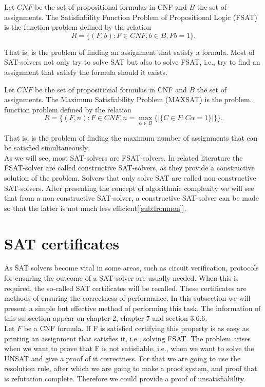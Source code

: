 \begin{definition}
  Let $CNF$ be the set of propositional formulas in CNF and $B$ the set of assignments.  The Satisfiability Function Problem of Propositional Logic (FSAT) is the function problem defined by the relation $$R=\{(F, b): F\in CNF, b \in B, Fb = 1\}.$$
\end{definition}
That is, is the problem of finding an assignment that satisfy a formula. Most of SAT-solvers not only try to solve SAT but also to solve FSAT, i.e., try to find an assignment that satisfy  the formula should it exists.
\begin{definition}
  Let $CNF$ be the set of propositional formulas in CNF and $B$ the set of assignments. The Maximum Satisfiability Problem (MAXSAT) is the problem. function problem defined by the relation $$R=\{(F,n) : F\in CNF, n = \max_{\alpha \in B}\{ | \{C\in F : C\alpha =1 \}| \}\}.$$
\end{definition}

That is, is the problem of finding the maximum number of assignments that can be satisfied simultaneously.\\

As we will see, most SAT-solvers are FSAT-solvers. In related literature the FSAT-solver are called constructive SAT-solvers, as they provide a constructive solution of the problem. Solvers that only solve SAT are called non-constructive SAT-solvers. After presenting the concept of algorithmic complexity we will see that from a non constructive SAT-solver, a constructive SAT-solver can be made so that the latter is not much less efficient[\ref{sub:fromnon}].


\section{SAT certificates}

As SAT solvers become vital in some areas, such as circuit verification, protocols for ensuring the outcome of a SAT-solver are usually needed. When this is required, the so-called SAT certificates will be recalled. These certificates are methods of ensuring the correctness of performance. In this subsection we will present a simple but effective method of performing this task. The information of this subsection appear on chapter 2\cite{schoning2013satisfiability}, chapter 7\cite{marek2009introduction} and section 3.6.6\cite{darwiche2009complete}.\\


Let $F$ be a CNF formula. If F is satisfied certifying this property is as easy as printing an assignment that satisfies it, i.e., solving FSAT. The problem arises when we want to prove that F is not satisfiable, i.e., when we want to solve the UNSAT and give a proof of it correctness. For that we are going to use the resolution rule, after which we are going to make a proof system, and proof that is refutation complete. Therefore we could provide a proof of unsatisfiability.

